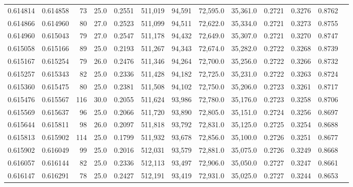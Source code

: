 \begin{tabular}{rrrrrrrrrrrrr}
0.614814 & 0.614858 &    73 & 25.0 &                                     0.2551 & 511,019 &  94,591 &  72,595.0 &  35,361.0 & 0.2721 & 0.3276 & 0.8762 \\
0.614866 & 0.614960 &    80 & 27.0 &                                     0.2523 & 511,099 &  94,511 &  72,622.0 &  35,334.0 & 0.2721 & 0.3273 & 0.8755 \\
0.614960 & 0.615043 &    79 & 27.0 &                                     0.2547 & 511,178 &  94,432 &  72,649.0 &  35,307.0 & 0.2721 & 0.3270 & 0.8747 \\
0.615058 & 0.615166 &    89 & 25.0 &                                     0.2193 & 511,267 &  94,343 &  72,674.0 &  35,282.0 & 0.2722 & 0.3268 & 0.8739 \\
0.615167 & 0.615254 &    79 & 26.0 &                                     0.2476 & 511,346 &  94,264 &  72,700.0 &  35,256.0 & 0.2722 & 0.3266 & 0.8732 \\
0.615257 & 0.615343 &    82 & 25.0 &                                     0.2336 & 511,428 &  94,182 &  72,725.0 &  35,231.0 & 0.2722 & 0.3263 & 0.8724 \\
0.615360 & 0.615475 &    80 & 25.0 &                                     0.2381 & 511,508 &  94,102 &  72,750.0 &  35,206.0 & 0.2723 & 0.3261 & 0.8717 \\
0.615476 & 0.615567 &   116 & 30.0 &                                     0.2055 & 511,624 &  93,986 &  72,780.0 &  35,176.0 & 0.2723 & 0.3258 & 0.8706 \\
0.615569 & 0.615637 &    96 & 25.0 &                                     0.2066 & 511,720 &  93,890 &  72,805.0 &  35,151.0 & 0.2724 & 0.3256 & 0.8697 \\
0.615644 & 0.615811 &    98 & 26.0 &                                     0.2097 & 511,818 &  93,792 &  72,831.0 &  35,125.0 & 0.2725 & 0.3254 & 0.8688 \\
0.615813 & 0.615902 &   114 & 25.0 &                                     0.1799 & 511,932 &  93,678 &  72,856.0 &  35,100.0 & 0.2726 & 0.3251 & 0.8677 \\
0.615902 & 0.616049 &    99 & 25.0 &                                     0.2016 & 512,031 &  93,579 &  72,881.0 &  35,075.0 & 0.2726 & 0.3249 & 0.8668 \\
0.616057 & 0.616144 &    82 & 25.0 &                                     0.2336 & 512,113 &  93,497 &  72,906.0 &  35,050.0 & 0.2727 & 0.3247 & 0.8661 \\
0.616147 & 0.616291 &    78 & 25.0 &                                     0.2427 & 512,191 &  93,419 &  72,931.0 &  35,025.0 & 0.2727 & 0.3244 & 0.8653 \\

\end{tabular}

